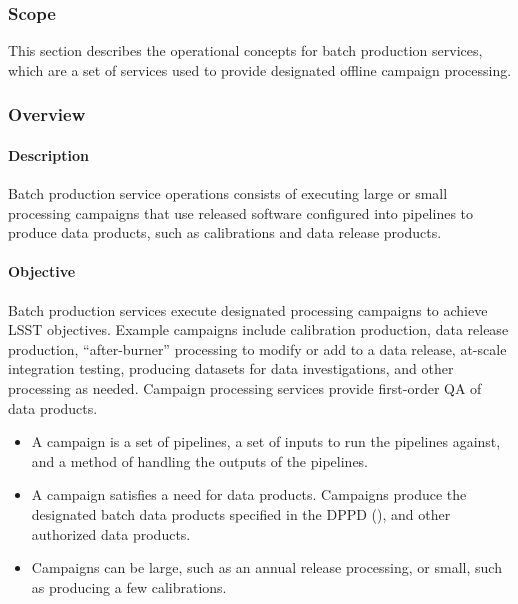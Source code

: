 ﻿\subsubsection{Scope}

This section describes the operational concepts for batch production services, 
which are a set of services used to provide designated offline campaign 
processing. 

\subsubsection{Overview}

\paragraph{Description}
Batch production service operations consists of executing large or small processing 
campaigns that use released software configured into pipelines to produce data products, 
such as calibrations and data release products. 

\paragraph{Objective}
Batch production services execute designated processing campaigns to achieve 
LSST objectives. Example campaigns include calibration production, data release 
production, ``after-burner'' processing to modify or add to a data release, 
at-scale integration testing, producing datasets for data investigations, and 
other processing as needed. Campaign processing services provide first-order QA 
of data products.

\begin{itemize}

\item A campaign is a set of pipelines, a set of inputs to run the pipelines 
against, and a method of handling the outputs of the pipelines.

\item A campaign satisfies a need for data products. Campaigns produce the 
designated batch data products specified in the DPPD (), and 
other authorized data products.

\item Campaigns can be large, such as an annual release processing, or small, 
such as producing a few calibrations.

\end{itemize}

